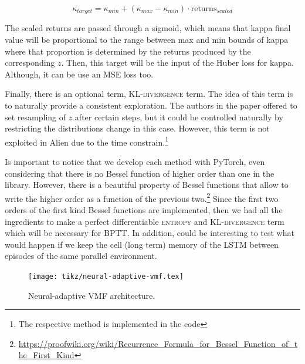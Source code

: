 \begin{equation}
    \kappa_{target} = \kappa_{min} + (\kappa_{max} - \kappa_{min}) \cdot \text{returns}_{scaled}
\end{equation}

The scaled returns are passed through a sigmoid, which means that kappa final value will be proportional to the range between max and min bounds of kappa where that proportion is determined by the returns produced by the corresponding $z$. Then, this target will be the input of the Huber loss for kappa. Although, it can be use an MSE loss too. 

Finally, there is an optional term, \textsc{KL-divergence} term. The idea of this term is to naturally provide a consistent exploration. The authors in the paper offered to set resampling of $z$ after certain steps, but it could be controlled naturally by restricting the distributions change in this case. However, this term is not exploited in Alien due to the time constrain.\footnote{The respective method is implemented in the code}

Is important to notice that we develop each method with PyTorch, even considering that there is no Bessel function of higher order than one in the library. 
However, there is a beautiful property of Bessel functions that allow to write the higher order as a function of the previous two.\footnote{\url{https://proofwiki.org/wiki/Recurrence_Formula_for_Bessel_Function_of_the_First_Kind}} Since the first two  orders of the first kind Bessel functions are implemented, then we had all the ingredients to make a perfect differentiable \textsc{entropy} and \textsc{KL-divergence} term which will be necessary for BPTT. In addition, could be interesting to test what would happen if we keep the cell (long term) memory of the LSTM between episodes of the same parallel environment.

\begin{figure}[H]
  \centering
  \texttt{[image: tikz/neural-adaptive-vmf.tex]}
  \caption{Neural-adaptive VMF architecture.}
  \label{fig:neural-adaptive-vmf}
\end{figure}


